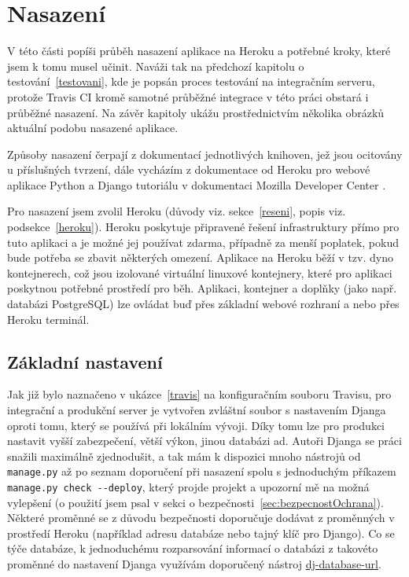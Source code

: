         
\chapter{Nasazení}\label{nasazeni}
    V této části popíši průběh nasazení aplikace na Heroku a potřebné kroky, které jsem k tomu musel učinit. Naváži tak na předchozí kapitolu o testování~\ref{testovani}, kde je popsán proces testování na integračním serveru, protože Travis CI kromě samotné průběžné integrace v této práci obstará i průběžné nasazení. Na závěr kapitoly ukážu prostřednictvím několika obrázků aktuální podobu nasazené aplikace.
    
    Způsoby nasazení čerpají z dokumentací jednotlivých knihoven, jež jsou ocitovány u příslušných tvrzení, dále vycházím z dokumentace od Heroku pro webové aplikace Python \cite{heroku-python} a Django tutoriálu v dokumentaci Mozilla Developer Center \cite{mdn-django}.
    
    Pro nasazení jsem zvolil Heroku (důvody viz. sekce~\ref{reseni}, popis viz. podsekce~\ref{heroku}). Heroku poskytuje připravené řešení infrastruktury přímo pro tuto aplikaci a je možné jej používat zdarma, případně za menší poplatek, pokud bude potřeba se zbavit některých omezení. Aplikace na Heroku běží v tzv. dyno kontejnerech, což jsou izolované virtuální linuxové kontejnery, které pro aplikaci poskytnou potřebné prostředí pro běh. Aplikaci, kontejner a doplňky (jako např. databázi PostgreSQL) lze ovládat buď přes základní webové rozhraní a nebo přes Heroku terminál.
    
    \section{Základní nastavení}\label{sec:zakladniNastaveni}
    Jak již bylo naznačeno v ukázce~\ref{travis} na konfiguračním souboru Travisu, pro integrační a produkční server je vytvořen zvláštní soubor s nastavením Djanga oproti tomu, který se používá při lokálním vývoji. Díky tomu lze pro produkci nastavit vyšší zabezpečení, větší výkon, jinou databázi ad. Autoři Djanga se práci snažili maximálně zjednodušit, a tak mám k dispozici mnoho nástrojů od \verb|manage.py| až po seznam doporučení při nasazení \cite{django-checklist} spolu s jednoduchým příkazem \verb|manage.py check --deploy|, který projde projekt a upozorní mě na možná vylepšení (o použití jsem psal v sekci o bezpečnosti~\ref{sec:bezpecnostOchrana}). Některé proměnné se z důvodu bezpečnosti doporučuje dodávat z proměnných v prostředí Heroku (například adresu databáze nebo tajný klíč pro Django). Co se týče databáze, k jednoduchému rozparsování informací o databázi z takovéto proměnné do nastavení Djanga využívám doporučený nástroj \href{https://github.com/kennethreitz/dj-database-url}{dj-database-url}.
    

